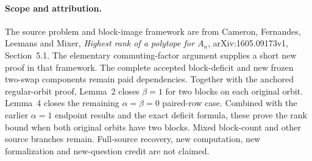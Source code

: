 \documentclass[11pt,a4paper]{article}
\begin{document}
\paragraph{Scope and attribution.}
The source problem and block-image framework are from Cameron,
Fernandes, Leemans and Mixer, \emph{Highest rank of a polytope
for $A_n$}, arXiv:1605.09173v1, Section~5.1.
The elementary commuting-factor argument supplies a short new
proof in that framework. The complete accepted block-deficit
and new frozen two-swap components remain paid dependencies.
Together with the anchored regular-orbit proof, Lemma~2 closes
$\beta=1$ for two blocks on each original orbit. Lemma~4 closes
the remaining $\alpha=\beta=0$ paired-row case. Combined with
the earlier $\alpha=1$ endpoint results and the exact deficit
formula, these prove the rank bound when both original orbits
have two blocks. Mixed block-count and other source branches remain.
Full-source recovery,
new computation, new formalization and new-question credit are
not claimed.
\end{document}
